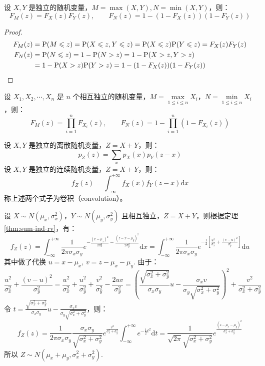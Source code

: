 \begin{theorem}[极值分布]
设 $X,Y$ 是独立的随机变量，$M=\max(X,Y),N=\min(X,Y)$，则：
\[F_M(z)=F_X(z)F_Y(z),\qquad F_N(z)=1-(1-F_X(z))(1-F_Y(z))\]
\end{theorem}
\begin{proof}
\begin{align*}
F_M(z)&=\mathrm{P}(M\leqslant z)=\mathrm{P}(X\leqslant z, Y\leqslant z)=\mathrm{P}(X\leqslant z)\mathrm{P}(Y\leqslant z)=F_X(z)F_Y(z)\\
F_N(z)&=\mathrm{P}(N\leqslant z)=1-\mathrm{P}(N>z)=1-\mathrm{P}(X>z, Y>z)\\
&=1-\mathrm{P}(X>z)\mathrm{P}(Y>z)=1-(1-F_X(z))(1-F_Y(z))
\end{align*}
\end{proof}

\begin{corollary}
设 $X_1,X_2,\cdots,X_n$ 是 $n$ 个相互独立的随机变量，$M=\max\limits_{1\leqslant i\leqslant n}X_i$，$N=\min\limits_{1\leqslant i\leqslant n}X_i$，则：
\[F_M(z)=\prod_{i=1}^nF_{X_i}(z),\qquad F_N(z)=1-\prod_{i=1}^n(1-F_{X_i}(z))\]
\end{corollary}

\begin{theorem}[独立随机变量之和——卷积]
\label{thm:sum-ind-rv}
设 $X,Y$ 是独立的离散随机变量，$Z=X+Y$，则：
\[p_Z(z)=\sum_x p_X(x)p_Y(z-x)\]
设 $X,Y$ 是独立的连续随机变量，$Z=X+Y$，则：
\[f_Z(z)=\int_{-\infty}^{+\infty} f_X(x)f_Y(z-x)\mathrm dx\]
称上述两个式子为卷积（convolution）。
\end{theorem}

\begin{example}[独立正态随机变量之和仍服从正态分布]
设 $X\sim N(\mu_x,\sigma_x^2)$，$Y\sim N(\mu_y,\sigma_y^2)$ 且相互独立，$Z=X+Y$，则根据定理 \ref{thm:sum-ind-rv}，有：
\[
f_Z(z)=\int_{-\infty}^{+\infty}\frac{1}{2\pi\sigma_x\sigma_y}e^{-\frac{(x-\mu_x)^2}{2\sigma_x^2}-\frac{(z-x-\mu_y)^2}{2\sigma_y^2}}\mathrm dx=\int_{-\infty}^{+\infty}\frac{1}{2\pi\sigma_x\sigma_y}e^{-\frac{1}{2}\left[\frac{u^2}{\sigma_x^2}+\frac{(v-u)^2}{\sigma_y^2}\right]}\mathrm du
\]
其中做了代换 $u=x-\mu_x,\,v=z-\mu_x-\mu_y$. 由于：
\[
\frac{u^2}{\sigma_x^2}+\frac{(v-u)^2}{\sigma_y^2}=\frac{u^2}{\sigma_x^2}+\frac{u^2}{\sigma_y^2}+\frac{v^2}{\sigma_y^2}-\frac{2uv}{\sigma_y^2}=\left(\frac{\sqrt{\sigma_x^2+\sigma_y^2}}{\sigma_x\sigma_y}u-\frac{\sigma_x v}{\sigma_y\sqrt{\sigma_x^2+\sigma_y^2}}\right)^2+\frac{v^2}{\sigma_x^2+\sigma_y^2}
\]
令 $t=\frac{\sqrt{\sigma_x^2+\sigma_y^2}}{\sigma_x\sigma_y}u-\frac{\sigma_x v}{\sigma_y\sqrt{\sigma_x^2+\sigma_y^2}}$，则：
\[
f_Z(z)=\frac{1}{2\pi\sigma_x\sigma_y}\frac{\sigma_x\sigma_y}{\sqrt{\sigma_x^2+\sigma_y^2}}e^{\frac{v^2}{\sigma_x^2+\sigma_y^2}}\int_{-\infty}^{+\infty}e^{-\frac{1}{2}t^2}\mathrm dt=\frac{1}{\sqrt{2\pi}\sqrt{\sigma_x^2+\sigma_y^2}}e^{\frac{(z-\mu_x-\mu_y)^2}{\sigma_x^2+\sigma_y^2}}
\]
所以 $Z\sim N(\mu_x+\mu_y,\sigma_x^2+\sigma_y^2)$.
\end{example}

